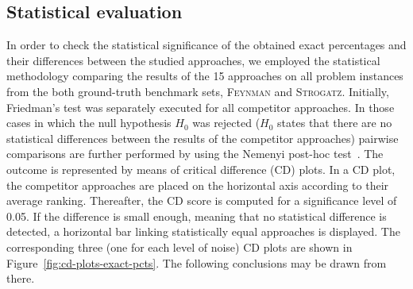 \documentclass[a4paper,12pt]{elsarticle}
\begin{document}
\subsection{Statistical evaluation}

In order to check the statistical significance of the obtained exact percentages and their differences between the studied approaches, we employed the statistical methodology comparing the results of  the 15 approaches on all problem instances from the both ground-truth benchmark sets, \textsc{Feynman} and \textsc{Strogatz}. Initially, Friedman’s test was separately executed for all competitor approaches.      In those cases in which the null hypothesis $H_0$ was rejected ($H_0$ states that there are no statistical differences between the results of the competitor approaches) pairwise comparisons are further performed by using the Nemenyi post-hoc test~\cite{pohlert2014pairwise}. The outcome is represented by means of critical difference (CD) plots. In a CD plot, the competitor approaches are placed on the horizontal axis according to their average ranking. Thereafter, the CD score is computed for a significance level of 0.05. If the difference is small enough, meaning that no statistical difference is detected, a horizontal bar linking statistically equal approaches is displayed.   The corresponding three (one for each level of noise) CD plots are shown in Figure~\ref{fig:cd-plots-exact-pcts}. The following conclusions may be drawn from there.
\end{document}

